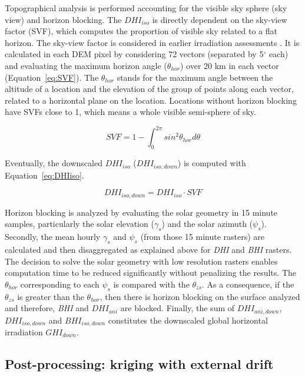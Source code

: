 \documentclass[11pt, english]{article}
\let\cite\citep
\begin{document}
Topographical analysis is performed accounting for the visible sky
sphere (sky view) and horizon blocking. The $DHI_{iso}$ is directly
dependent on the sky-view factor (SVF), which computes the proportion
of visible sky related to a flat horizon. The sky-view factor is
considered in earlier irradiation assessments
\cite{Ruiz-Arias.Cebecauer.ea2010, Corripio2003}. It is calculated in
each DEM pixel by considering 72 vectors (separated by 5$^\circ$ each)
and evaluating the maximum horizon angle ($\theta_{hor}$) over 20 km
in each vector (Equation~\ref{eq:SVF}). The $\theta_{hor}$ stands for
the maximum angle between the altitude of a location and the elevation
of the group of points along each vector, related to a horizontal
plane on the location. Locations without horizon blocking have SVFs
close to 1, which means a whole visible semi-sphere of sky.

\begin{equation}
\label{eq:SVF}
SVF=1-\int_0^{2\pi}sin^{2} \theta_{hor} d\theta
\end{equation}

Eventually, the downscaled $DHI_{iso}$ ($DHI_{iso,down}$) is
computed with Equation~\ref{eq:DHIiso}.

\begin{equation}
\label{eq:DHIiso}
DHI_{iso,down}=DHI_{iso}\cdot{}SVF
\end{equation}

Horizon blocking is analyzed by evaluating the solar geometry in 15 minute samples, particularly the solar elevation ($\gamma_{s}$) and the solar azimuth ($\psi_{s}$). Secondly, the mean hourly $\gamma_{s}$ and $\psi_{s}$ (from those 15 minute rasters) are calculated and then disaggregated as explained above for \emph{DHI} and \emph{BHI} rasters. The decision to solve the solar geometry with low resolution rasters enables computation time to be reduced significantly without penalizing the results. The $\theta_{hor}$ corresponding to each $\psi_{s}$ is compared with the $\theta_{zs}$. As a consequence, if the $\theta_{zs}$ is greater than the $\theta_{hor}$, then there is horizon blocking on the surface analyzed and therefore, \emph{BHI} and $DHI_{ani}$ are blocked. Finally, the sum of $DHI_{ani,down}$, $DHI_{iso,down}$ and $BHI_{iso,down}$ constitutes the downscaled global horizontal irradiation $GHI_{down}$.

\subsection{Post-processing: kriging with external drift}
\label{sec:meth}
\end{document}
